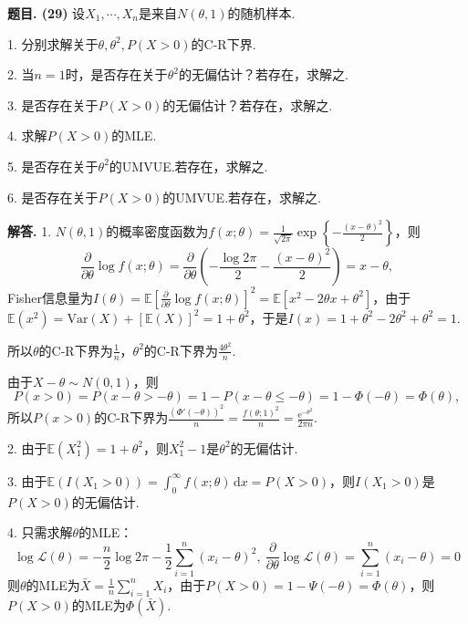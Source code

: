 \documentclass[12pt, a4paper, oneside]{ctexart}
\newcounter{problem}  %
\newenvironment{problem}[1][]{\stepcounter{problem}\par\noindent\textbf{题目\arabic{problem}. #1}}{\smallskip\par}
\newenvironment{solution}[1][]{\par\noindent\textbf{#1解答. }}{\smallskip\par}  %
\let\leq=\leqslant %
\def\E{\mathbb{E}}          %
\def\var{\text{Var}}        %
\def\d{\mathrm{d}}          %
\def\e{\mathrm{e}}          %
\def\L{\mathcal{L}}         %
\def\add{\vspace{1ex}}      %
\begin{document}
\begin{problem}[(29)]
    设$X_1,\cdots,X_n$是来自$N(\theta,1)$的随机样本.

    1. 分别求解关于$\theta, \theta^2, P(X>0)$的C-R下界.

    2. 当$n=1$时，是否存在关于$\theta^2$的无偏估计？若存在，求解之.

    3. 是否存在关于$P(X>0)$的无偏估计？若存在，求解之.

    4. 求解$P(X>0)$的MLE.

    5. 是否存在关于$\theta^2$的UMVUE.若存在，求解之.

    6. 是否存在关于$P(X>0)$的UMVUE.若存在，求解之.\add
\end{problem}
\begin{solution}
    1. $N(\theta,1)$的概率密度函数为$f(x;\theta) = \frac{1}{\sqrt{2\pi}}\exp\left\{-\frac{(x-\theta)^2}{2}\right\}$，则
    \begin{equation*}
        \frac{\partial}{\partial\theta}\log f(x;\theta) = \frac{\partial}{\partial\theta}\left(-\frac{\log 2\pi}{2}-\frac{(x-\theta)^2}{2}\right) = x-\theta,
    \end{equation*}
    Fisher信息量为$I(\theta) = \E\left[\frac{\partial}{\partial\theta}\log f(x;\theta)\right]^2 = \E[x^2-2\theta x+\theta^2]$，\add 由于$\E(x^2) = \var(X) + [\E(X)]^2 = 1+\theta^2$，于是$I(x) = 1+\theta^2-2\theta^2+\theta^2 =1$.

    所以$\theta$的C-R下界为$\frac{1}{n}$，$\theta^2$的C-R下界为$\frac{4\theta^2}{n}$.
    
    由于$X-\theta\sim N(0,1)$，则
    \begin{equation*}
        P(x>0) = P(x-\theta > -\theta) = 1-P(x-\theta\leq -\theta) = 1-\Phi(-\theta)=\Phi(\theta),
    \end{equation*}
    所以$P(x > 0)$的C-R下界为$\frac{\left(\Phi'(-\theta)\right)^2}{n} = \frac{f(\theta;1)^2}{n} = \frac{\e^{-\theta^2}}{2\pi n}$.\add

    2. 由于$\E(X_1^2) = 1+\theta^2$，则$X_1^2-1$是$\theta^2$的无偏估计.

    3. 由于$\E(I(X_1 > 0)) = \int_0^\infty f(x;\theta)\,\d x = P(X>0)$，则$I(X_1>0)$是$P(X>0)$的无偏估计.

    4. 只需求解$\theta$的MLE：
    \begin{equation*}
        \log\L(\theta) = -\frac{n}{2}\log 2\pi-\frac{1}{2}\sum_{i=1}^n(x_i-\theta)^2,\ \frac{\partial}{\partial\theta}\log\L(\theta) = \sum_{i=1}^n(x_i-\theta) = 0
    \end{equation*}
    则$\theta$的MLE为$\bar{X} = \frac{1}{n}\sum_{i=1}^nX_i$，由于$P(X>0) = 1-\Psi(-\theta)=\Phi(\theta)$，则$P(X>0)$的MLE为$\Phi(\bar{X})$.


\end{solution}
\end{document}
